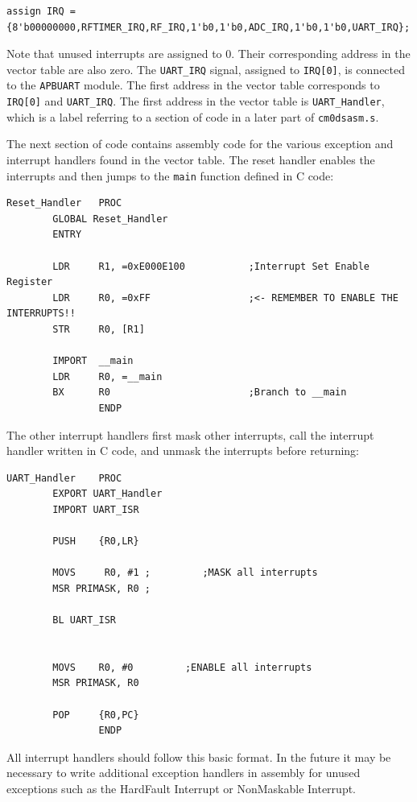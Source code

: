 \begin{lstlisting}
assign IRQ = {8'b00000000,RFTIMER_IRQ,RF_IRQ,1'b0,1'b0,ADC_IRQ,1'b0,1'b0,UART_IRQ};
\end{lstlisting}

Note that unused interrupts are assigned to 0. Their corresponding address in the vector table are also zero. The \texttt{UART\_IRQ} signal, assigned to \texttt{IRQ[0]}, is connected to the \texttt{APBUART} module. The first address in the vector table corresponds to \texttt{IRQ[0]} and \texttt{UART\_IRQ}. The first address in the vector table is \texttt{UART\_Handler}, which is a label referring to a section of code in a later part of \texttt{cm0dsasm.s}.

The next section of code contains assembly code for the various exception and interrupt handlers found in the vector table. The reset handler enables the interrupts and then jumps to the \texttt{main} function defined in C code:

\begin{lstlisting}
Reset_Handler   PROC
        GLOBAL Reset_Handler
        ENTRY

        LDR     R1, =0xE000E100           ;Interrupt Set Enable Register
        LDR     R0, =0xFF                 ;<- REMEMBER TO ENABLE THE INTERRUPTS!!
        STR     R0, [R1]

        IMPORT  __main
        LDR     R0, =__main               
        BX      R0                        ;Branch to __main
                ENDP
\end{lstlisting}

The other interrupt handlers first mask other interrupts, call the interrupt handler written in C code, and unmask the interrupts
before returning:

\begin{lstlisting}
UART_Handler    PROC
        EXPORT UART_Handler
        IMPORT UART_ISR

        PUSH    {R0,LR}

        MOVS     R0, #1 ;         ;MASK all interrupts
        MSR PRIMASK, R0 ; 		

        BL UART_ISR


        MOVS    R0, #0         ;ENABLE all interrupts
        MSR PRIMASK, R0

        POP     {R0,PC}
                ENDP 
\end{lstlisting}

All interrupt handlers should follow this basic format. In the future it may be necessary to write additional exception handlers in assembly for unused exceptions such as the HardFault Interrupt or NonMaskable Interrupt.

